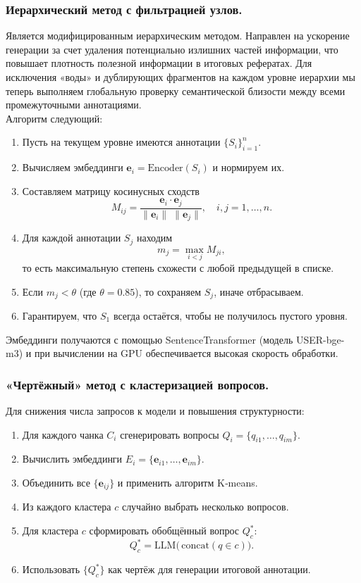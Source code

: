 \documentclass{article}
\theoremstyle{definition}
\theoremstyle{plain}
\begin{document}
\subsubsection*{Иерархический метод с фильтрацией узлов.}
Является модифицированным иерархическим методом. Направлен на ускорение генерации за счет удаления потенциально излишних частей информации, что повышает плотность полезной информации в итоговых рефератах. 
Для исключения «воды» и дублирующих фрагментов на каждом уровне иерархии мы теперь выполняем глобальную проверку семантической близости между всеми промежуточными аннотациями. 
\\Алгоритм следующий:

\begin{enumerate}
  \item Пусть на текущем уровне имеются аннотации $\{S_i\}_{i=1}^n$.
  \item Вычисляем эмбеддинги $\mathbf{e}_i = \mathrm{Encoder}(S_i)$ и нормируем их.
  \item Составляем матрицу косинусных сходств
    \[
      M_{ij} = \frac{\mathbf{e}_i \cdot \mathbf{e}_j}{\|\mathbf{e}_i\|\;\|\mathbf{e}_j\|},
      \quad i,j=1,\dots,n.
    \]
  \item Для каждой аннотации $S_j$ находим
    \[
      m_j = \max_{\,i<j} M_{ji},
    \]
    то есть максимальную степень схожести с любой предыдущей в списке.
  \item Если $m_j < \theta$ (где $\theta=0.85$), то сохраняем $S_j$, иначе отбрасываем.
  \item Гарантируем, что $S_1$ всегда остаётся, чтобы не получилось пустого уровня.
\end{enumerate}
Эмбеддинги получаются с помощью SentenceTransformer (модель USER-bge-m3) и при вычислении на GPU обеспечивается высокая скорость обработки.

\subsubsection*{«Чертёжный» метод с кластеризацией вопросов.}
Для снижения числа запросов к модели и повышения структурности:
\begin{enumerate}
  \item Для каждого чанка $C_i$ сгенерировать вопросы $Q_i = \{q_{i1},\dots,q_{im}\}$.
  \item Вычислить эмбеддинги $E_i = \{\mathbf{e}_{i1},\dots,\mathbf{e}_{im}\}$.
  \item Объединить все $\{\mathbf{e}_{ij}\}$ и применить алгоритм K‑means.
  \item Из каждого кластера $c$ случайно выбрать несколько вопросов.
  \item Для кластера $c$ сформировать обобщённый вопрос $Q_c^*$:
    \[
      Q_c^* = \mathrm{LLM}\bigl(\,\text{concat}(q\in c)\bigr).
    \]
  \item Использовать $\{Q_c^*\}$ как чертёж для генерации итоговой аннотации.
\end{enumerate}
\end{document}
